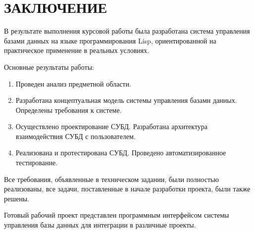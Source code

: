 \section*{ЗАКЛЮЧЕНИЕ}

В результате выполнения курсовой работы была разработана система управления базами данных на языке программирования Lisp, ориентированной на практическое применение в реальных условиях.
 
Основные результаты работы:

\begin{enumerate}
\item Проведен анализ предметной области.
\item Разработана концептуальная модель системы управления базами данных.  Определены требования к системе.
\item Осуществлено проектирование СУБД. Разработана архитектура взаимодействия СУБД с пользователем.
\item Реализована и протестирована СУБД. Проведено автоматизированное тестирование.
\end{enumerate}

Все требования, объявленные в техническом задании, были полностью реализованы, все задачи, поставленные в начале разработки проекта, были также решены.

Готовый рабочий проект представлен программным интерфейсом системы управления базы данных для интеграции в различные проекты.  
